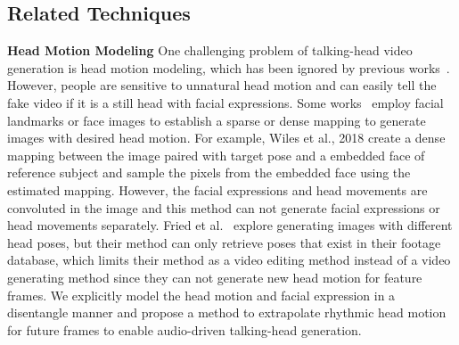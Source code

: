 \documentclass[runningheads]{llncs}
\begin{document}
\subsection{Related Techniques }
\label{subsec:related_tec}
\noindent \textbf{Head Motion Modeling} \quad
One challenging problem of talking-head video generation is head motion modeling, which has been ignored by previous works~\cite{pumarola2019ganimation,vougioukas2019realistic,chung2017you,ijcai2019-129,zhou2019talking}. However, people are sensitive to unnatural head motion and can easily tell the fake video if it is a still head with facial expressions. Some works~\cite{zakharov2019few,wang2018fewshotvid2vid,wiles2018x2face} employ facial landmarks or face images to establish a sparse or dense mapping to generate images with desired head motion. For example, Wiles et al., 2018  create a dense mapping between the image paired with target pose and a embedded face of reference subject and sample the pixels from the embedded face using the estimated mapping. However, the facial expressions and head movements are convoluted in the image and this method can not generate facial expressions or head movements separately. Fried et al.~\cite{Fried19} explore generating images with different head poses, but their method can only retrieve poses that exist in their footage database, which limits their method as a video editing method instead of a video generating method since they can not generate new head motion for feature frames. We explicitly model the head motion and facial expression in a disentangle manner and propose a method to extrapolate rhythmic head motion for future frames to enable audio-driven talking-head generation.  %
\end{document}
